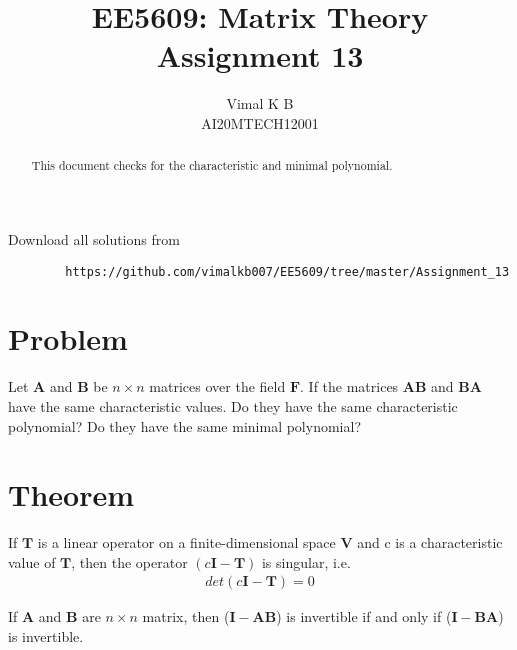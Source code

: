 \documentclass[journal,12pt,twocolumn]{IEEEtran}
\begin{document}
	\makeatletter
	\makeatother
	\let\StandardTheFigure\thefigure
	\let\vec\mathbf
	\renewcommand{\thefigure}{\theproblem}
	\def\putbox#1#2#3{\makebox[0in][l]{\makebox[#1][l]{}\raisebox{\baselineskip}[0in][0in]{\raisebox{#2}[0in][0in]{#3}}}}
	\def\rightbox#1{\makebox[0in][r]{#1}}
	\def\centbox#1{\makebox[0in]{#1}}
	\def\topbox#1{\raisebox{-\baselineskip}[0in][0in]{#1}}
	\def\midbox#1{\raisebox{-0.5\baselineskip}[0in][0in]{#1}}
	\vspace{3cm}
	\title{EE5609: Matrix Theory\\
		Assignment 13\\}
	\author{Vimal K B\\
		AI20MTECH12001}
	\maketitle
	\newpage
	\bigskip
	\renewcommand{\thefigure}{\theenumi}
	\renewcommand{\thetable}{\theenumi}
	\begin{abstract}
		This document checks for the characteristic and minimal polynomial.
	\end{abstract}
	Download all solutions from 
	\begin{lstlisting}
		https://github.com/vimalkb007/EE5609/tree/master/Assignment_13
	\end{lstlisting}
	\section{Problem}
	Let $\vec{A}$ and $\vec{B}$ be $n\times n$ matrices over the field $\mathbf{F}$. If the matrices $\vec{AB}$ and $\vec{BA}$ have the same characteristic values. Do they have the same characteristic polynomial? Do they have the same minimal polynomial? 
	
	
	\section{Theorem}
	
	\begin{theorem}\label{thm1}
		If $\mathbf{T}$ is a linear operator on a finite-dimensional space $\vec{V}$ and c is a characteristic value of $\mathbf{T}$, then the operator $(c\vec{I}-\mathbf{T})$ is singular, i.e.
		\begin{align}
			det\left(c\vec{I}-\mathbf{T}\right) = 0 \nonumber
		\end{align} 
	\end{theorem}
	\begin{theorem}\label{thm2}
		If $\vec{A}$ and $\vec{B}$ are $n\times n$ matrix, then ($\vec{I}-\vec{AB}$) is invertible if and only if ($\vec{I}-\vec{BA}$) is invertible. 
	\end{theorem}
	
\end{document}
